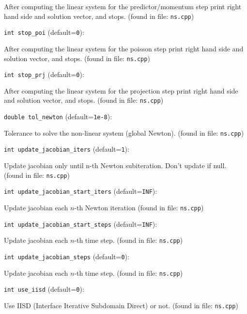 After computing the linear system for the
 predictor/momentum step print right hand side
 and solution vector, and stops.
 (found in file: \verb+ns.cpp+)
\item\verb+int stop_poi+ {\rm(default=\verb|0|)}:

After computing the linear system for the poisson step print
right hand side and solution vector, and stops. 
 (found in file: \verb+ns.cpp+)
\item\verb+int stop_prj+ {\rm(default=\verb|0|)}:

After computing the linear system for the projection step print
right hand side and solution vector, and stops. 
 (found in file: \verb+ns.cpp+)
\item\verb+double tol_newton+ {\rm(default=\verb|1e-8|)}:

Tolerance to solve the non-linear system (global Newton).
 (found in file: \verb+ns.cpp+)
\item\verb+int update_jacobian_iters+ {\rm(default=\verb|1|)}:

Update jacobian only until n-th Newton subiteration. 
Don't update if null. 
 (found in file: \verb+ns.cpp+)
\item\verb+int update_jacobian_start_iters+ {\rm(default=\verb|INF|)}:

Update jacobian each $n$-th Newton iteration
 (found in file: \verb+ns.cpp+)
\item\verb+int update_jacobian_start_steps+ {\rm(default=\verb|INF|)}:

Update jacobian each $n$-th time step. 
 (found in file: \verb+ns.cpp+)
\item\verb+int update_jacobian_steps+ {\rm(default=\verb|0|)}:

Update jacobian each $n$-th time step. 
 (found in file: \verb+ns.cpp+)
\item\verb+int use_iisd+ {\rm(default=\verb|0|)}:

Use IISD (Interface Iterative Subdomain Direct) or not.
 (found in file: \verb+ns.cpp+)

